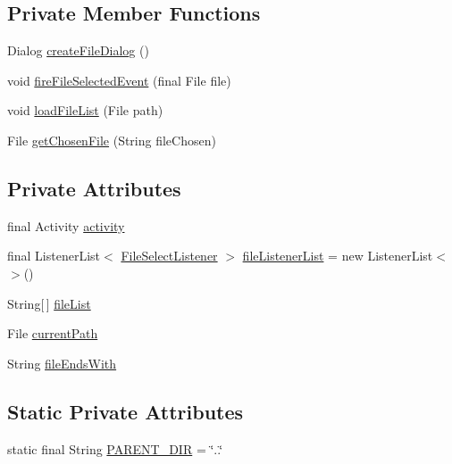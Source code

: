 \subsection*{Private Member Functions}
\begin{DoxyCompactItemize}
\item 
Dialog \hyperlink{classorg_1_1buildmlearn_1_1toolkit_1_1utilities_1_1FileDialog_a6f7eeebe225e6bac532902bc18a4f336}{create\+File\+Dialog} ()
\item 
void \hyperlink{classorg_1_1buildmlearn_1_1toolkit_1_1utilities_1_1FileDialog_a40a770b6280f6da496438aa4e904baf9}{fire\+File\+Selected\+Event} (final File file)
\item 
void \hyperlink{classorg_1_1buildmlearn_1_1toolkit_1_1utilities_1_1FileDialog_afdce16d10e893af4f5cee829336ff2bf}{load\+File\+List} (File path)
\item 
File \hyperlink{classorg_1_1buildmlearn_1_1toolkit_1_1utilities_1_1FileDialog_af7042a49f16d9477042f4d742680e0dd}{get\+Chosen\+File} (String file\+Chosen)
\end{DoxyCompactItemize}
\subsection*{Private Attributes}
\begin{DoxyCompactItemize}
\item 
final Activity \hyperlink{classorg_1_1buildmlearn_1_1toolkit_1_1utilities_1_1FileDialog_a145f83bf45ccc4012513d57f1d95301f}{activity}
\item 
final Listener\+List$<$ \hyperlink{interfaceorg_1_1buildmlearn_1_1toolkit_1_1utilities_1_1FileDialog_1_1FileSelectListener}{File\+Select\+Listener} $>$ \hyperlink{classorg_1_1buildmlearn_1_1toolkit_1_1utilities_1_1FileDialog_a2cf83e551b79e78da54f700a1b190fd6}{file\+Listener\+List} = new Listener\+List$<$$>$()
\item 
String\mbox{[}$\,$\mbox{]} \hyperlink{classorg_1_1buildmlearn_1_1toolkit_1_1utilities_1_1FileDialog_a1e400eed62012e5265738f58fb0f73e1}{file\+List}
\item 
File \hyperlink{classorg_1_1buildmlearn_1_1toolkit_1_1utilities_1_1FileDialog_a0f49a1b6543e0abc023df6a1eed7e8a5}{current\+Path}
\item 
String \hyperlink{classorg_1_1buildmlearn_1_1toolkit_1_1utilities_1_1FileDialog_a66078998b4ef3f93e4cbb16de037e244}{file\+Ends\+With}
\end{DoxyCompactItemize}
\subsection*{Static Private Attributes}
\begin{DoxyCompactItemize}
\item 
static final String \hyperlink{classorg_1_1buildmlearn_1_1toolkit_1_1utilities_1_1FileDialog_ad807a8c118a38deafe9e989241110418}{P\+A\+R\+E\+N\+T\+\_\+\+D\+IR} = \char`\"{}..\char`\"{}
\end{DoxyCompactItemize}


